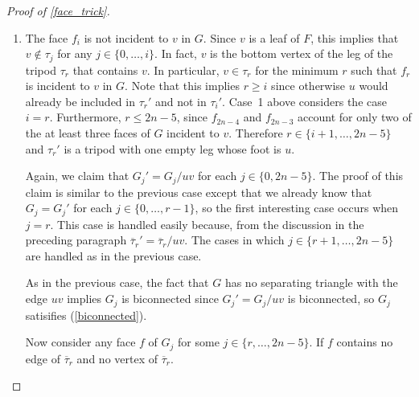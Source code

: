 \documentclass{patmorin}
\begin{document}
\begin{proof}[Proof of \cref{face_trick}]
\begin{enumerate}
    Since $G_j'=G_j/uv$, there is an injective function from the faces of $G_j'$ onto the faces of $G_j$.  Therefore, for any face $f\not\in\{f_{2n-3},f_{2n-4}\}$ of $G_j$ there is a corresponding face $f'$ of $G_j'$.  It is straightforward to verify that $J_\mathcal{F}(f)=J_\mathcal{F'}(f')$ and therefore $f$ satisfies (\ref{three_faces}) since $f'$ satisfies (\ref{three_faces}).
    
    \item The face $f_i$ is not incident to $v$ in $G$.  Since $v$ is a leaf of $F$, this implies that $v\not\in \tau_j$ for any $j\in\{0,\ldots,i\}$.  In fact, $v$ is the bottom vertex of the leg of the tripod $\tau_r$ that contains $v$.  In particular, $v\in\tau_r$ for the minimum $r$ such that $f_r$ is incident to $v$ in $G$.  Note that this implies $r\ge i$ since otherwise $u$ would already be included in $\tau_r'$ and not in $\tau_i'$. Case~1 above considers the case $i=r$.  Furthermore, $r\le 2n-5$, since  $f_{2n-4}$ and $f_{2n-3}$ account for only two of the at least three faces of $G$ incident to $v$.  Therefore $r\in\{i+1,\ldots,2n-5\}$ and $\tau_r'$ is a tripod with one empty leg whose foot is $u$.
    
    Again, we claim that $G_j'=G_j/uv$ for each $j\in\{0,2n-5\}$.  The proof of this claim is similar to the previous case except that we already know that $G_j=G_j'$ for each $j\in\{0,\ldots,r-1\}$, so the first interesting case occurs when $j=r$. This case is handled easily because, from the discussion in the preceding paragraph $\overline{\tau}_r'=\overline{\tau}_r/uv$.  The cases in which $j\in\{r+1,\ldots,2n-5\}$ are handled as in the previous case.

    As in the previous case, the fact that $G$ has no separating triangle with the edge $uv$ implies $G_j$ is biconnected since $G_j'=G_j/uv$ is biconnected, so $G_j$ satisifies (\ref{biconnected}).
    
    
    
    
    Now consider any face $f$ of $G_j$ for some $j\in\{r,\ldots,2n-5\}$.  If $f$ contains no edge of $\overline{\tau}_r$ and no vertex of $\overline{\tau}_r$.
    

\end{enumerate}
\end{proof}
\end{document}
